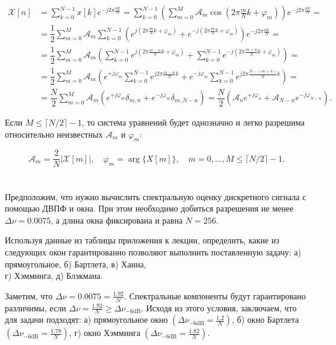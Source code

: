 \begin{align*}
\mathcal{X}[n] &= \sum \limits_{k=0}^{N-1}x[k]e^{-j2\pi\frac{nk}{N}} = 
\sum \limits_{k=0}^{N-1} \left(\sum \limits_{m=0}^{M} \mathcal{A}_m \cos\left(2\pi\frac{m}{N}k + \varphi_m \right)\right) e^{-j2\pi\frac{nk}{N}} = \\
&= \dfrac{1}{2} \sum \limits_{m=0}^{M} \mathcal{A}_m
\sum \limits_{k=0}^{N-1} \left( e^{j(2\pi\frac{m}{N}k + \varphi_m)} + e^{-j(2\pi\frac{m}{N}k + \varphi_m)} \right) e^{-j2\pi\frac{nk}{N}} = \\
&= \dfrac{1}{2} \sum \limits_{m=0}^{M} \mathcal{A}_m \left( 
\sum \limits_{k=0}^{N-1}  e^{j(2\pi\frac{m-n}{N}k + \varphi_m)}
+  \sum \limits_{k=0}^{N-1}  e^{-j(2\pi\frac{m+n}{N}k + \varphi_m)}
\right) = \\
&= \dfrac{1}{2} \sum \limits_{m=0}^{M} \mathcal{A}_m \left( 
e^{+j\varphi_m}\sum \limits_{k=0}^{N-1}  e^{j2\pi\frac{m-n}{N}k}
+  e^{-j\varphi_m}\sum \limits_{k=0}^{N-1}  e^{j2\pi\frac{N-(m+n)}{N}k}
\right) = \\
&= \dfrac{N}{2} \sum \limits_{m=0}^{M} \mathcal{A}_m \left( 
e^{+j\varphi_m}\delta_{m, n}
+  e^{-j\varphi_m}\delta_{m, N - n}
\right) = \dfrac{N}{2} \left(\mathcal{A}_ne^{+j\varphi_n} + \mathcal{A}_{N-n}e^{-j\varphi_{N-n}}\right).
\end{align*}

Если $M \leq \lceil N/2 \rceil - 1$, то система уравнений будет однозначно и легко разрешима относительно неизвестных $\mathcal{A}_m$ и $\varphi_m$:

\begin{equation*}
\mathcal{A}_{m} = \dfrac{2}{N}|\mathcal{X}[m]|, \quad \varphi_m = \arg\{X[m]\}, \quad m=0, \ldots, M \leq \lceil N/2 \rceil - 1.
\end{equation*}

\section{}
Предположим, что нужно вычислить спектральную оценку дискретного сигнала с помощью ДВПФ и окна. При этом необходимо добиться разрешения не менее $\Delta \nu = 0.0075$, а длина окна фиксирована и равна $N = 256$. 

Используя данные из таблицы приложения к лекции, определить, какие из следующих окон гарантированно позволяют выполнить поставленную задачу:
а) прямоугольное,	б) Бартлета,	в) Ханна,\\	г) Хэмминга,	д) Блэкмана.

Заметим, что $\Delta \nu = 0.0075 = \frac{1.92}{N}$. Спектральные компоненты будут гарантировано различимы, если $\Delta \nu = \frac{1.92}{N} \geq \Delta \nu_{-6\text{dB}}$. Исходя из этого условия, заключаем, что для задачи подходят: 
а) прямоугольное окно $\left(\Delta \nu_{-6\text{dB}} = \frac{1.2}{N}\right)$,
б) окно Бартлета $\left(\Delta \nu_{-6\text{dB}} = \frac{1.78}{N}\right)$, 
г) окно Хэмминга $\left(\Delta \nu_{-6\text{dB}} = \frac{1.82}{N}\right)$.
